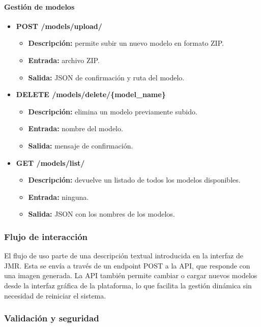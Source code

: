 \paragraph{Gestión de modelos}
\begin{itemize}
    \item \textbf{POST /models/upload/}
    \begin{itemize}
        \item \textbf{Descripción:} permite subir un nuevo modelo en formato ZIP.
        \item \textbf{Entrada:} archivo ZIP.
        \item \textbf{Salida:} JSON de confirmación y ruta del modelo.
    \end{itemize}

    \item \textbf{DELETE /models/delete/\{model\_name\}}
    \begin{itemize}
        \item \textbf{Descripción:} elimina un modelo previamente subido.
        \item \textbf{Entrada:} nombre del modelo.
        \item \textbf{Salida:} mensaje de confirmación.
    \end{itemize}

    \item \textbf{GET /models/list/}
    \begin{itemize}
        \item \textbf{Descripción:} devuelve un listado de todos los modelos disponibles.
        \item \textbf{Entrada:} ninguna.
        \item \textbf{Salida:} JSON con los nombres de los modelos.
    \end{itemize}
\end{itemize}

\subsubsection{Flujo de interacción}

El flujo de uso parte de una descripción textual introducida en la interfaz de JMR. Esta se envía a través de un endpoint POST a la API, que responde con una imagen generada. La API también permite cambiar o cargar nuevos modelos desde la interfaz gráfica de la plataforma, lo que facilita la gestión dinámica sin necesidad de reiniciar el sistema.

\subsubsection{Validación y seguridad}


